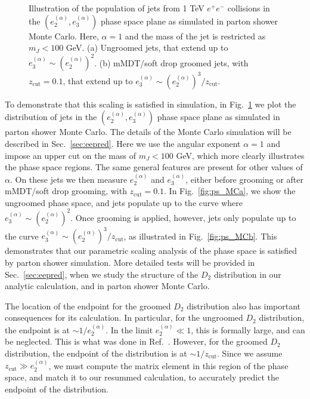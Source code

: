 \documentclass[a4paper,11pt]{article}
\newcommand{\ecf}[2]{e_{#1}^{(#2)}}
\def\zcut{z_{\text{cut}}}
\DeclareRobustCommand{\Sec}[1]{Sec.~\ref{#1}}
\DeclareRobustCommand{\Fig}[1]{Fig.~\ref{#1}}
\DeclareRobustCommand{\Ref}[1]{Ref.~\cite{#1}}
\begin{document}
\begin{figure}
\begin{center}
\qquad
{}
\end{center}
\caption{Illustration of the population of jets from 1 TeV $e^+e^-$ collisions in the $(\ecf{2}{\alpha},\ecf{3}{\alpha})$ phase space plane as simulated in parton shower Monte Carlo.  Here, $\alpha=1$ and the mass of the jet is restricted as $m_J<100$ GeV.  (a) Ungroomed jets, that extend up to $\ecf{3}{\alpha}\sim(\ecf{2}{\alpha})^2$.  (b) mMDT/soft drop groomed jets, with $\zcut=0.1$, that extend up to $\ecf{3}{\alpha}\sim(\ecf{2}{\alpha})^3/\zcut$.
}
\label{fig:phasespace_MC}
\end{figure}

To demonstrate that this scaling is satisfied in simulation, in \Fig{fig:phasespace_MC} we plot the distribution of jets in the $(\ecf{2}{\alpha},\ecf{3}{\alpha})$ phase space plane as simulated in parton shower Monte Carlo.  The details of the Monte Carlo simulation will be described in \Sec{sec:eepred}.  Here we use the angular exponent $\alpha=1$ and impose an upper cut on the mass of $m_J<100$ GeV, which more clearly illustrates the phase space regions.  The same general features are present for other values of $\alpha$.  On these jets we then measure $\ecf{2}{\alpha}$ and $\ecf{3}{\alpha}$, either before grooming or after mMDT/soft drop grooming, with $\zcut = 0.1$.  In \Fig{fig:ps_MCa}, we show the ungroomed phase space, and jets populate up to the curve where $\ecf{3}{\alpha}\sim(\ecf{2}{\alpha})^2$.  Once grooming is applied, however, jets only populate up to the curve $\ecf{3}{\alpha}\sim(\ecf{2}{\alpha})^3/\zcut$, as illustrated in \Fig{fig:ps_MCb}.  This demonstrates that our parametric scaling analysis of the phase space is satisfied by parton shower simulation. More detailed tests will be provided in \Sec{sec:eepred}, when we study the structure of the $D_2$ distribution in our analytic calculation, and in parton shower Monte Carlo.

The location of the endpoint for the groomed $D_2$ distribution also has important consequences for its calculation. In particular, for the ungroomed $D_2$ distribution, the endpoint is at $\sim1/\ecf{2}{\alpha}$. In the limit $\ecf{2}{\alpha}\ll 1$, this is formally large, and can be neglected.  This is what was done in \Ref{Larkoski:2015kga}.  However, for the groomed $D_2$ distribution, the endpoint of the distribution is at $\sim1/\zcut$. Since we assume $\zcut \gg \ecf{2}{\alpha}$, we must compute the matrix element in this region of the phase space, and match it to our resummed calculation, to accurately predict the endpoint of the distribution. 
\end{document}

